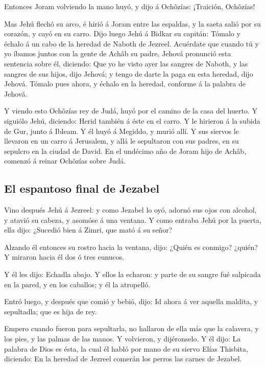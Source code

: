  Entonces Joram volviendo la mano huyó, y dijo á
Ochôzías: ¡Traición, Ochôzías!

 Mas Jehú flechó su arco, é hirió á Joram entre las
espaldas, y la saeta salió por su corazón, y cayó en su carro.
 Dijo luego Jehú á Bidkar su capitán: Tómalo y échalo á
un cabo de la heredad de Naboth de Jezreel. Acuérdate que cuando tú y yo
íbamos juntos con la gente de Achâb su padre, Jehová pronunció esta
sentencia sobre él, diciendo:  Que yo he visto ayer las
sangres de Naboth, y las sangres de sus hijos, dijo Jehová; y tengo de
darte la paga en esta heredad, dijo Jehová. Tómalo pues ahora, y échalo
en la heredad, conforme á la palabra de Jehová.

 Y viendo esto Ochôzías rey de Judá, huyó por el camino
de la casa del huerto. Y siguiólo Jehú, diciendo: Herid también á éste
en el carro. Y le hirieron á la subida de Gur, junto á Ibleam. Y él huyó
á Megiddo, y murió allí.  Y sus siervos le llevaron en un
carro á Jerusalem, y allá le sepultaron con sus padres, en su sepulcro
en la ciudad de David.  En el undécimo año de Joram hijo
de Achâb, comenzó á reinar Ochôzías sobre Judá.

\hypertarget{el-espantoso-final-de-jezabel}{%
\subsection{El espantoso final de
Jezabel}\label{el-espantoso-final-de-jezabel}}

 Vino después Jehú á Jezreel: y como Jezabel lo oyó,
adornó sus ojos con alcohol, y atavió su cabeza, y asomóse á una
ventana.  Y como entraba Jehú por la puerta, ella dijo:
¿Sucedió bien á Zimri, que mató á su señor?

 Alzando él entonces su rostro hacia la ventana, dijo:
¿Quién es conmigo? ¿quién? Y miraron hacia él dos ó tres eunucos.

 Y él les dijo: Echadla abajo. Y ellos la echaron: y
parte de su sangre fué salpicada en la pared, y en los caballos; y él la
atropelló.

 Entró luego, y después que comió y bebió, dijo: Id ahora
á ver aquella maldita, y sepultadla; que es hija de rey.

 Empero cuando fueron para sepultarla, no hallaron de
ella más que la calavera, y los pies, y las palmas de las manos.
 Y volvieron, y dijéronselo. Y él dijo: La palabra de
Dios es ésta, la cual él habló por mano de su siervo Elías Thisbita,
diciendo: En la heredad de Jezreel comerán los perros las carnes de
Jezabel.

